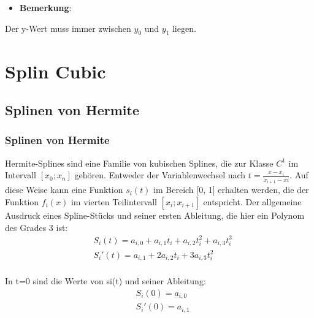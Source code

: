 {\begin{frame}
			\begin{itemize}                 %
				\item \textbf{Bemerkung}:
			\end{itemize}
			Der y-Wert muss immer zwischen \(y_0\) und \(y_1\) liegen.
		\end{frame}
		
		
		
		\section{Splin Cubic}%
		\label{chap:verf-los}           %
		
		\subsection{Splinen von Hermite}
		\begin{frame}
			\frametitle{Splinen von Hermite}
			
			Hermite-Splines sind eine Familie von kubischen Splines, die zur Klasse \(C^1\) im Intervall \([x_0; x_n]\) gehören.
			Entweder der Variablenwechsel nach \(t=\frac{x-x_i}{x_{i+1}-xi}\). Auf diese Weise kann eine Funktion \(s_i(t)\) im Bereich [0, 1] erhalten werden, die der Funktion \(f_i(x)\) im vierten Teilintervall \([x_i; x_{i+1}]\) entspricht.\cite{Hermite}
			Der allgemeine Ausdruck eines Spline-Stücks und seiner ersten Ableitung, die hier ein Polynom des Grades 3 ist:
			\begin{align*}
				& S_i(t)=a_{i,0}+a_{i,1}t_i+a_{i,2}t_i^2+a_{i,3}t_i^3\\
				& S_i'(t)=a_{i,1}+2a_{i,2}t_i+3a_{i,3}t_i^2\\
			\end{align*}
		\end{frame}
		
		
		
		In t=0 sind die Werte von si(t) und seiner Ableitung:
		\begin{align*}
			& S_i(0)=a_{i,0}\\
			& S_i'(0)=a_{i,1}\\
		\end{align*}
		
}

